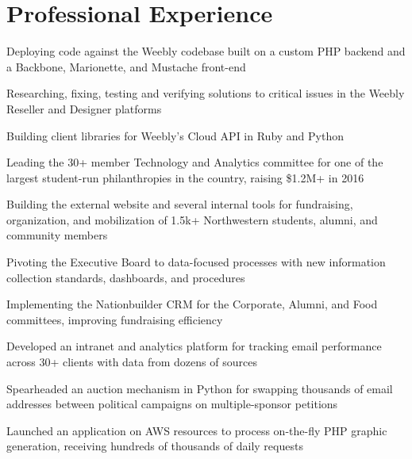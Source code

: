 
\section{Professional Experience}

\vspace{\topsep}
\begin{listitems}
\item Deploying code against the Weebly codebase built on a custom PHP backend and a Backbone, Marionette, and Mustache front-end
\item Researching, fixing, testing and verifying solutions to critical issues in the Weebly Reseller and Designer platforms
\item Building client libraries for Weebly's Cloud API in Ruby and Python
\end{listitems}
\sectionsep

\begin{listitems}
\item Leading the 30+ member Technology and Analytics committee for one of the largest student-run philanthropies in the country, raising \$1.2M+ in 2016
\item Building the external website and several internal tools for fundraising, organization, and mobilization of 1.5k+ Northwestern students, alumni, and community members
\item Pivoting the Executive Board to data-focused processes with new information collection standards, dashboards, and procedures
\item Implementing the Nationbuilder CRM for the Corporate, Alumni, and Food committees, improving fundraising efficiency
\end{listitems}
\sectionsep

\begin{listitems}
\item Developed an intranet and analytics platform for tracking email performance across 30+ clients with data from dozens of sources
\item Spearheaded an auction mechanism in Python for swapping thousands of email addresses between political campaigns on multiple-sponsor petitions
\item Launched an application on AWS resources to process on-the-fly PHP graphic generation, receiving hundreds of thousands of daily requests
\end{listitems}
\sectionsep

